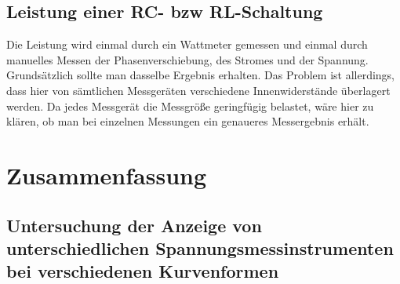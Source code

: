 \documentclass{article}
\begin{document}
%
%


\subsection{Leistung einer RC- bzw RL-Schaltung}

Die Leistung wird einmal durch ein Wattmeter gemessen und einmal durch manuelles Messen der Phasenverschiebung, des Stromes und der Spannung. Grundsätzlich sollte man dasselbe Ergebnis erhalten. Das Problem ist allerdings, dass hier von sämtlichen Messgeräten verschiedene Innenwiderstände überlagert werden.  Da jedes Messgerät die Messgröße geringfügig belastet, wäre hier zu klären, ob man bei einzelnen Messungen ein genaueres Messergebnis erhält. 




\section{Zusammenfassung}

\subsection{Untersuchung  der  Anzeige  von  unterschiedlichen  Spannungsmessinstrumenten  bei verschiedenen Kurvenformen }
\end{document}
